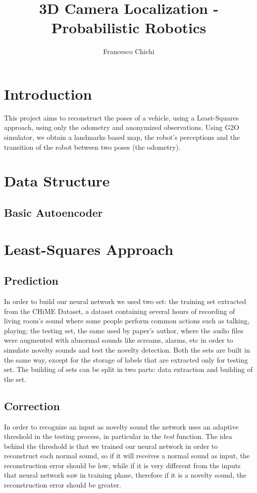 \documentclass[10pt]{article}
\title{3D Camera Localization - Probabilistic Robotics}
\author{ Francesco Chichi}
\begin{document}
	\maketitle
	\section{Introduction}
		This project aims to reconstruct the poses of a vehicle, using a Least-Squares approach, using only the odometry and anonymized observations. 
		Using G2O simulator, we obtain a landmarks based map, the robot's perceptions and the transition of the robot between two poses (the odometry).

	\section{Data Structure}
	\subsection{Basic Autoencoder}

	\section{Least-Squares Approach}
	\subsection{Prediction}
	In order to build our neural network we used two set: the training set extracted from the CHiME Dataset, a dataset containing several hours of recording of living room's sound where some people perform common actions such as talking, playing; the testing set, the same used by paper's author, where the audio files were augmented with abnormal sounds like screams, alarms, etc in order to simulate novelty sounds and test the novelty detection.
	Both the sets are built in the same way, except for the storage of labels that are extracted only for testing set. The building of sets can be split in two parts: data extraction and building of the set.\\
	
	
	\subsection{Correction}
	
	In order to recognize an input as novelty sound the network uses an adaptive threshold in the testing process, in particular in the \textit{test} function. The idea behind the threshold is that we trained our neural network in order 
	to reconstruct each normal sound, so if it will receives a normal sound as input, the reconstruction error should be low, while if it is very different from the inputs that neural network  saw in training phase, therefore if it is a novelty sound, the reconstruction error should be greater. \\
	
\end{document}
